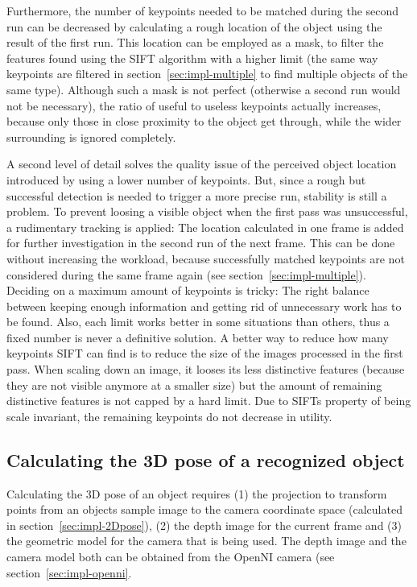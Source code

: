 Furthermore, the number of keypoints needed to be matched during the second run can be decreased by calculating a rough location of the object using the result of the first run. This location can be employed as a mask, to filter the features found using the SIFT algorithm with a higher limit (the same way keypoints are filtered in section~\ref{sec:impl-multiple} to find multiple objects of the same type). Although such a mask is not perfect (otherwise a second run would not be necessary), the ratio of useful to useless keypoints actually increases, because only those in close proximity to the object get through, while the wider surrounding is ignored completely.

A second level of detail solves the quality issue of the perceived object location introduced by using a lower number of keypoints. But, since a rough but successful detection is needed to trigger a more precise run, stability is still a problem. To prevent loosing a visible object when the first pass was unsuccessful, a rudimentary tracking is applied: The location calculated in one frame is added for further investigation in the second run of the next frame. This can be done without increasing the workload, because successfully matched keypoints are not considered during the same frame again (see section~\ref{sec:impl-multiple}). \\

Deciding on a maximum amount of keypoints is tricky: The right balance between keeping enough information and getting rid of unnecessary work has to be found. Also, each limit works better in some situations than others, thus a fixed number is never a definitive solution. A better way to reduce how many keypoints SIFT can find is to reduce the size of the images processed in the first pass. When scaling down an image, it looses its less distinctive features (because they are not visible anymore at a smaller size) but the amount of remaining distinctive features is not capped by a hard limit. Due to SIFTs property of being scale invariant, the remaining keypoints do not decrease in utility.

\subsection{Calculating the 3D pose of a recognized object}
\label{sec:impl-3Dpose}
Calculating the 3D pose of an object requires (1) the projection to transform points from an objects sample image to the camera coordinate space (calculated in section~\ref{sec:impl-2Dpose}), (2) the depth image for the current frame and (3) the geometric model for the camera that is being used. The depth image and the camera model both can be obtained from the OpenNI camera (see section~\ref{sec:impl-openni}. \\

